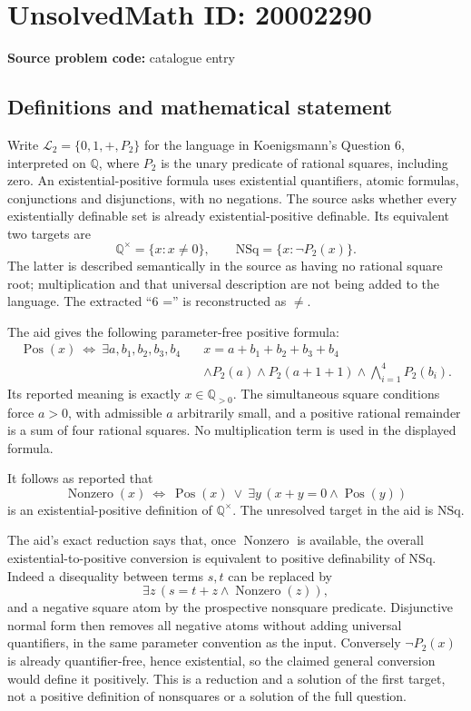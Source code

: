 \documentclass[11pt]{article}
\begin{document}
\section*{UnsolvedMath ID: 20002290}
\textbf{Source problem code:} catalogue entry
\subsection{Definitions and mathematical statement}
Write \(\mathcal L_2=\{0,1,+,P_2\}\) for the language in Koenigsmann's Question 6, interpreted on \(\mathbb Q\), where \(P_2\) is the unary predicate of rational squares, including zero. An existential-positive formula uses existential quantifiers, atomic formulas, conjunctions and disjunctions, with no negations. The source asks whether every existentially definable set is already existential-positive definable. Its equivalent two targets are
\[
 \mathbb Q^\times=\{x:x\ne0\},\qquad
 \mathrm{NSq}=\{x:\neg P_2(x)\}.
\]
The latter is described semantically in the source as having no rational square root; multiplication and that universal description are not being added to the language. The extracted ``6 ='' is reconstructed as \(\ne\).

The aid gives the following parameter-free positive formula:
\[
 \begin{split}
 \operatorname{Pos}(x)\ \Longleftrightarrow\
 \exists a,b_1,b_2,b_3,b_4\quad
 &x=a+b_1+b_2+b_3+b_4\\
 &\wedge P_2(a)\wedge P_2(a+1+1)
 \wedge\bigwedge_{i=1}^4P_2(b_i).
 \end{split}
\]
Its reported meaning is exactly \(x\in\mathbb Q_{>0}\). The simultaneous square conditions force \(a>0\), with admissible \(a\) arbitrarily small, and a positive rational remainder is a sum of four rational squares. No multiplication term is used in the displayed formula.

It follows as reported that
\[
 \operatorname{Nonzero}(x)\ \Longleftrightarrow\
 \operatorname{Pos}(x)\ \vee\
 \exists y\,(x+y=0\wedge\operatorname{Pos}(y))
\]
is an existential-positive definition of \(\mathbb Q^\times\). The unresolved target in the aid is \(\mathrm{NSq}\).

The aid's exact reduction says that, once \(\operatorname{Nonzero}\) is available, the overall existential-to-positive conversion is equivalent to positive definability of \(\mathrm{NSq}\). Indeed a disequality between terms \(s,t\) can be replaced by
\[
 \exists z\,(s=t+z\wedge\operatorname{Nonzero}(z)),
\]
and a negative square atom by the prospective nonsquare predicate. Disjunctive normal form then removes all negative atoms without adding universal quantifiers, in the same parameter convention as the input. Conversely \(\neg P_2(x)\) is already quantifier-free, hence existential, so the claimed general conversion would define it positively. This is a reduction and a solution of the first target, not a positive definition of nonsquares or a solution of the full question.
\end{document}

